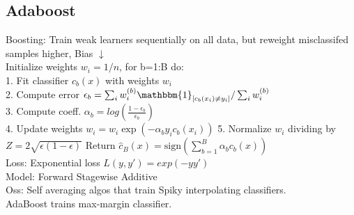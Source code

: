 \subsection*{Adaboost}
Boosting: Train weak learners sequentially on all data, but reweight misclassifed samples higher, Bias $\downarrow$\\
Initialize weights $w_i = 1/n$, for b=1:B do:\\
1. Fit classifier $c_b(x)$ with weights $w_i$\\
2. Compute error $\epsilon_b = \sum_i w_i^{(b)} \mathbbm{1}_{[c_b(x_i) \not = y_i]} / \sum_i w_i^{(b)}$\\
3. Compute coeff. $\alpha_b = log(\frac{1-\epsilon_b}{\epsilon_b})$\\
4. Update weights $w_i = w_i \exp(-\alpha_b y_i c_b(x_i))$
5. Normalize $w_i$ dividing by $Z = 2\sqrt{\epsilon(1-\epsilon)}$
Return $\hat{c}_B(x) = \text{sign} \left ( \sum_{b=1}^B \alpha_b c_b(x) \right )$\\
Loss: Exponential loss $L(y,y')=exp(-yy')$\\
Model: Forward Stagewise Additive\\
Oss: Self averaging algos that train Spiky interpolating classifiers.\\
AdaBoost trains max-margin classifier.


